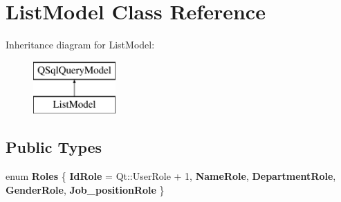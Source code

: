 \hypertarget{class_list_model}{}\section{List\+Model Class Reference}
\label{class_list_model}
Inheritance diagram for List\+Model\+:\begin{figure}[H]
\begin{center}
\leavevmode
\includegraphics[height=2.000000cm]{class_list_model}
\end{center}
\end{figure}
\subsection*{Public Types}
\begin{DoxyCompactItemize}
\item 
\mbox{\label{class_list_model_a878f6de48ea8627511fe16821149bf65}} 
enum {\bfseries Roles} \{ \newline
{\bfseries Id\+Role} = Qt\+:\+:User\+Role + 1, 
{\bfseries Name\+Role}, 
{\bfseries Department\+Role}, 
{\bfseries Gender\+Role}, 
\newline
{\bfseries Job\+\_\+position\+Role}
 \}
\end{DoxyCompactItemize}
